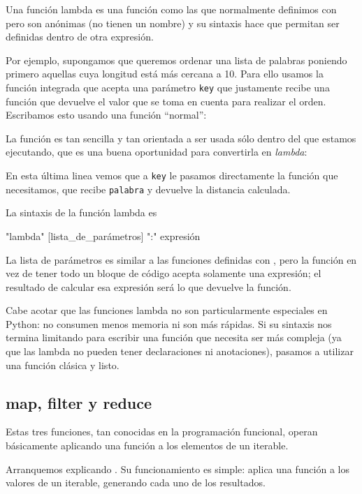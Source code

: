 Una función lambda es una función como las que normalmente definimos con  pero son anónimas (no tienen un nombre) y su sintaxis hace que permitan ser definidas dentro de otra expresión.

Por ejemplo, supongamos que queremos ordenar una lista de palabras poniendo primero aquellas cuya longitud está más cercana a 10. Para ello usamos la función integrada  que acepta una parámetro \texttt{key} que justamente recibe una función que devuelve el valor que se toma en cuenta para realizar el orden. Escribamos esto usando una función ``normal'':


La función es tan sencilla y tan orientada a ser usada sólo dentro del  que estamos ejecutando, que es una buena oportunidad para convertirla en \textit{lambda}:


En esta última linea vemos que a \texttt{key} le pasamos directamente la función que necesitamos, que recibe \texttt{palabra} y devuelve la distancia calculada.

La sintaxis de la función lambda es 

\begin{verb}
"lambda" [lista_de_parámetros] ":" expresión
\end{verb}

La lista de parámetros es similar a las funciones definidas con , pero la función en vez de tener todo un bloque de código acepta solamente una expresión; el resultado de calcular esa expresión será lo que devuelve la función.

Cabe acotar que las funciones lambda no son particularmente especiales en Python: no consumen menos memoria ni son más rápidas. Si su sintaxis nos termina limitando para escribir una función que necesita ser más compleja (ya que las lambda no pueden tener declaraciones ni anotaciones), pasamos a utilizar una función clásica y listo.


\subsection{map, filter y reduce}

Estas tres funciones, tan conocidas en la programación funcional, operan básicamente aplicando una función a los elementos de un iterable. 

Arranquemos explicando . Su funcionamiento es simple: aplica una función a los valores de un iterable, generando cada uno de los resultados. 

